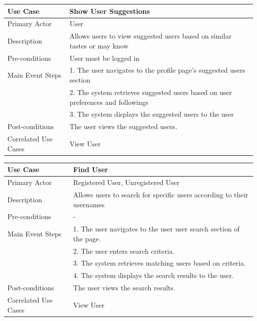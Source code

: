 \newpage

\begin{longtable}{|p{}|p{}|}
    \hline
    \rowcolor{lightblue}
    \textbf{Use Case} & \textbf{Show User Suggestions} \\
    \hline
    Primary Actor &User \\
    \hline
    Description &Allows users to view suggested users based on similar tastes or may know\\
    \hline
    Pre-conditions & User must be logged in\\
    \hline
    Main Event Steps &1. The user navigates to the profile page's suggested users section\\
    &2. The system retrieves suggested users based on user preferences and followings\\
    &3. The system displays the suggested users to the user\\
    \hline
    Post-conditions & The user views the suggested users.\\
    \hline
    Correlated Use Cases & View User\\
    \hline
\end{longtable}


\begin{longtable}{|p{}|p{}|}
    \hline
    \rowcolor{lightblue}
    \textbf{Use Case} & \textbf{Find User} \\
    \hline
    Primary Actor & Registered User, Unregistered User\\
    \hline
    Description & Allows users to search for specific users according to their usernames\\
    \hline
    Pre-conditions &- \\
    \hline
    Main Event Steps & 1. The user navigates to the user user search section of the page. \\
    & 2. The user enters search criteria. \\
    & 3. The system retrieves matching users based on criteria. \\
    & 4. The system displays the search results to the user. \\
    \hline
    Post-conditions & The user views the search results. \\
    \hline
    Correlated Use Cases & View User\\
    \hline
\end{longtable}

